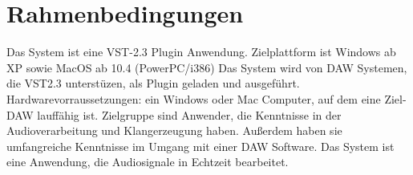 \section{Rahmenbedingungen}


 Das System ist eine VST-2.3 Plugin Anwendung.
 Zielplattform ist Windows ab XP sowie MacOS ab 10.4 (PowerPC/i386)
 Das System wird von DAW Systemen, die VST2.3 unterstüzen, als Plugin geladen und ausgeführt.
 Hardwarevorraussetzungen: ein Windows oder Mac Computer, auf dem eine Ziel-DAW lauffähig ist.
 Zielgruppe sind Anwender, die Kenntnisse in der Audioverarbeitung und Klangerzeugung haben. Außerdem haben sie umfangreiche Kenntnisse im Umgang mit einer DAW Software.
 Das System ist eine Anwendung, die Audiosignale in Echtzeit bearbeitet.